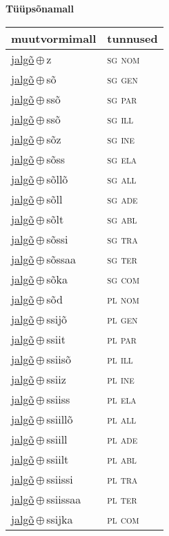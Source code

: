 

\vspace{3.5em}
\noindent \begin{minipage}{\textwidth}
\noindent \textbf{Tüüpsõnamall \,}\\

\begin{sideways}
\begin{tabular}{l l}
muutvormimall & tunnused \\
\hline
\underline{jalgõ}\,$\oplus$\,z & \textsc{ sg nom } \\
\underline{jalgõ}\,$\oplus$\,sõ & \textsc{ sg gen } \\
\underline{jalgõ}\,$\oplus$\,ssõ & \textsc{ sg par } \\
\underline{jalgõ}\,$\oplus$\,ssõ & \textsc{ sg ill } \\
\underline{jalgõ}\,$\oplus$\,sõz & \textsc{ sg ine } \\
\underline{jalgõ}\,$\oplus$\,sõss & \textsc{ sg ela } \\
\underline{jalgõ}\,$\oplus$\,sõllõ & \textsc{ sg all } \\
\underline{jalgõ}\,$\oplus$\,sõll & \textsc{ sg ade } \\
\underline{jalgõ}\,$\oplus$\,sõlt & \textsc{ sg abl } \\
\underline{jalgõ}\,$\oplus$\,sõssi & \textsc{ sg tra } \\
\underline{jalgõ}\,$\oplus$\,sõssaa & \textsc{ sg ter } \\
\underline{jalgõ}\,$\oplus$\,sõka & \textsc{ sg com } \\
\underline{jalgõ}\,$\oplus$\,sõd & \textsc{ pl nom } \\
\underline{jalgõ}\,$\oplus$\,ssijõ & \textsc{ pl gen } \\
\underline{jalgõ}\,$\oplus$\,ssiit & \textsc{ pl par } \\
\underline{jalgõ}\,$\oplus$\,ssiisõ & \textsc{ pl ill } \\
\underline{jalgõ}\,$\oplus$\,ssiiz & \textsc{ pl ine } \\
\underline{jalgõ}\,$\oplus$\,ssiiss & \textsc{ pl ela } \\
\underline{jalgõ}\,$\oplus$\,ssiillõ & \textsc{ pl all } \\
\underline{jalgõ}\,$\oplus$\,ssiill & \textsc{ pl ade } \\
\underline{jalgõ}\,$\oplus$\,ssiilt & \textsc{ pl abl } \\
\underline{jalgõ}\,$\oplus$\,ssiissi & \textsc{ pl tra } \\
\underline{jalgõ}\,$\oplus$\,ssiissaa & \textsc{ pl ter } \\
\underline{jalgõ}\,$\oplus$\,ssijka & \textsc{ pl com } \\
\end{tabular}
\end{sideways}
\label{tab:tüüpsõnamall-jalgõz}

\end{minipage}

